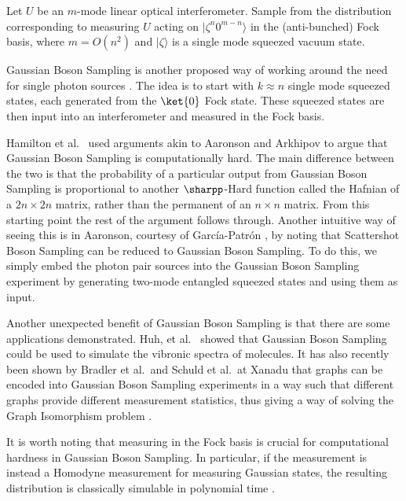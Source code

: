 \begin{problem} Let $U$ be an $m$-mode linear optical interferometer. Sample from the distribution corresponding to measuring $U$ acting on $|\zeta^n0^{m-n}\rangle$ in the (anti-bunched) Fock basis, where $m=O(n^2)$ and $|\zeta\rangle$ is a single mode squeezed vacuum state.
\end{problem}

Gaussian Boson Sampling is another proposed way of working around the need for single photon sources \cite{hamilton2017}. The idea is to start with $k\approx n$ single mode squeezed states, each generated from the $\ket{0}$ Fock state. These squeezed states are then input into an interferometer and measured in the Fock basis.

Hamilton et al.~\cite{hamilton2017} used arguments akin to Aaronson and Arkhipov to argue that Gaussian Boson Sampling is computationally hard. The main difference between the two is that the probability of a particular output from Gaussian Boson Sampling is proportional to another $\sharpp$-Hard function called the Hafnian of a $2n\times 2n$ matrix, rather than the permanent of an $n\times n$ matrix. From this starting point the rest of the argument follows through. Another intuitive way of seeing this is in Aaronson, courtesy of Garc\'{i}a-Patr\'{o}n \cite{aaronson2013}, by noting that Scattershot Boson Sampling can be reduced to Gaussian Boson Sampling. To do this, we simply embed the photon pair sources into the Gaussian Boson Sampling experiment by generating two-mode entangled squeezed states and using them as input.

Another unexpected benefit of Gaussian Boson Sampling is that there are some applications demonstrated. Huh, et al.~\cite{huh2015} showed that Gaussian Boson Sampling could be used to simulate the vibronic spectra of molecules. It has also recently been shown by Bradler et al.\ and Schuld et al.\ at Xanadu that graphs can be encoded into Gaussian Boson Sampling experiments in a way such that different graphs provide different measurement statistics, thus giving a way of solving the Graph Isomorphism problem \cite{bradler2018, schuld2019}.

It is worth noting that measuring in the Fock basis is crucial for computational hardness in Gaussian Boson Sampling. In particular, if the measurement is instead a Homodyne measurement for measuring Gaussian states, the resulting distribution is classically simulable in polynomial time \cite{bartlett2003}.

